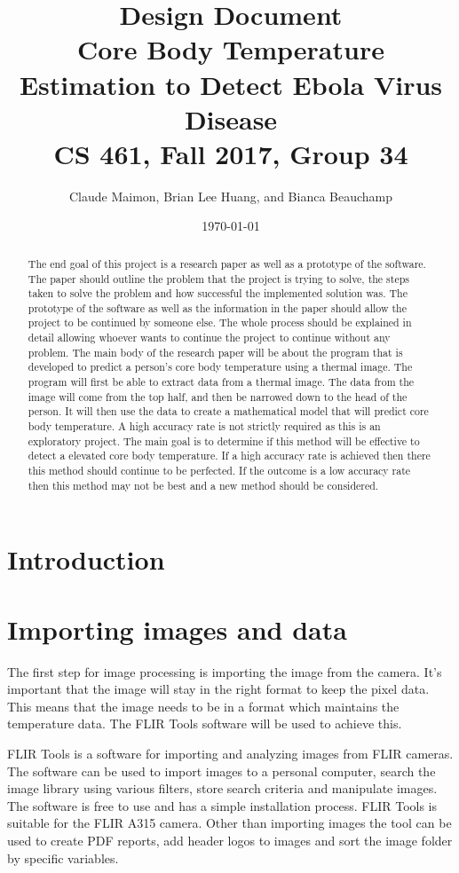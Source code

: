 ﻿\documentclass[onecolumn, draftclsnofoot,10pt, compsoc]{IEEEtran}
\title{%
  Design Document \\
  \vspace{0.4cm}
  \large Core Body Temperature Estimation to Detect Ebola Virus Disease \\
  \vspace{0.4cm}
  \large CS 461, Fall 2017, Group 34\\
    }
\author{Claude Maimon, Brian Lee Huang, and Bianca Beauchamp}
\date{\today}
\begin{document}
\maketitle

\begin{abstract}
	The end goal of this project is a research paper as well as a prototype of the software. The paper should outline the problem that the project is trying to solve, the steps taken to solve the problem and how successful the implemented solution was. The prototype of the software as well as the information in the paper should allow the project to be continued by someone else. The whole process should be explained in detail allowing whoever wants to continue the project to continue without any problem. The main body of the research paper will be about the program that is developed to predict a person's core body temperature using a thermal image. The program will first be able to extract data from a thermal image. The data from the image will come from the top half, and then be narrowed down to the head of the person. It will then use the data to create a mathematical model that will predict core body temperature. A high accuracy rate is not strictly required as this is an exploratory project. The main goal is to determine if this method will be effective to detect a elevated core body temperature. If a high accuracy rate is achieved then there this method should continue to be perfected. If the outcome is a low accuracy rate then this method may not be best and a new method should be considered.
\end{abstract}

\newpage

\tableofcontents
\newpage
\section{Introduction}

\section{Importing images and data}

The first step for image processing is importing the image from the camera. It’s important that the image will stay in the right format to keep the pixel data. This means that the image needs to be in a format which maintains the temperature data. The FLIR Tools software will be used to achieve this. 

FLIR Tools is a software for importing and analyzing images from FLIR cameras. The software can be used to import images to a personal computer, search the image library using various filters, store search criteria and manipulate images. The software is free to use and has a simple installation process. FLIR Tools is suitable for the FLIR A315 camera. Other than importing images the tool can be used to create PDF reports, add header logos to images and sort the image folder by specific variables.\cite{ClaudeTech}
\end{document}
